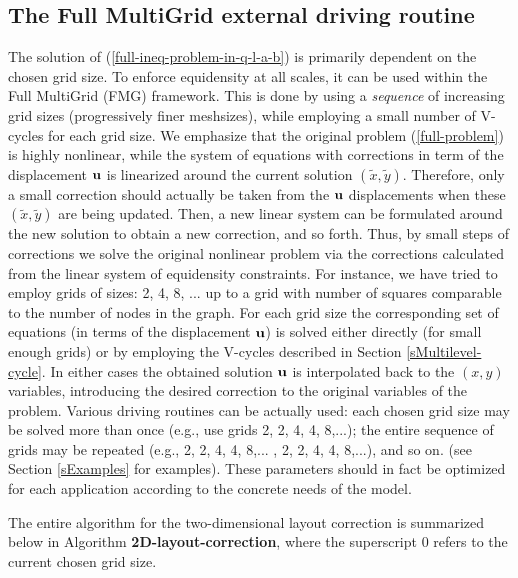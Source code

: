 \documentclass[final]{siamltex}
\begin{document}
\subsection{The Full MultiGrid external driving routine}\label{sExternalCycle}
\par The solution of (\ref{full-ineq-problem-in-q-l-a-b}) is primarily dependent on the chosen grid size.
To enforce equidensity at all scales, it can be used within the
Full MultiGrid (FMG) framework. This is done by using a {\it
sequence} of increasing grid sizes (progressively finer
meshsizes), while employing a small number of V-cycles for each
grid size. We emphasize that the original problem
(\ref{full-problem}) is highly nonlinear, while the system of
equations with corrections in term of the displacement ${\bf u}$ is
linearized around the current solution $(\tilde{x},\tilde{y})$.
Therefore, only a small correction should actually be taken from
the ${\bf u}$ displacements when these $(\tilde{x},\tilde{y})$ are
being updated. Then, a new linear system can be formulated around
the new solution to obtain a new correction, and so forth. Thus, by small
steps of corrections we solve the original nonlinear problem via
the corrections calculated from the linear system of equidensity
constraints. For instance, we have tried to employ grids of sizes:
2, 4, 8, ... up to a grid with number of squares comparable to the
number of nodes in the graph. For each grid size the corresponding
set of equations (in terms of the displacement ${\bf u}$) is solved
either directly (for small enough grids) or by employing the
V-cycles described in Section \ref{sMultilevel-cycle}. In either
cases the obtained solution ${\bf u}$ is interpolated back to the
$(x,y)$ variables, introducing the desired correction to the
original variables of the problem. Various driving routines can be
actually used: each chosen grid size may be solved more than once
(e.g., use grids 2, 2, 4, 4, 8,...); the entire sequence of grids
may be repeated (e.g., 2, 2, 4, 4, 8,... , 2, 2, 4, 4, 8,...),
and so on. (see Section \ref{sExamples} for examples). These parameters
should in fact be optimized for each application according to the
concrete needs of the model.
\par The entire algorithm for the two-dimensional layout correction
is summarized below in Algorithm {\bf 2D-layout-correction}, where
the superscript 0 refers to the current chosen grid size.
\vspace{3mm}
\end{document}
